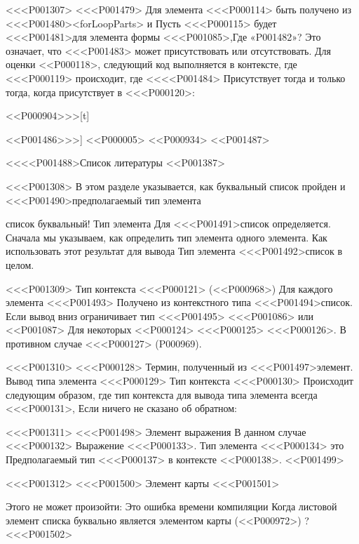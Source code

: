 {{{{{{{{{{{<<<P001307>%
<<<P001479> Для элемента
<<<P000114> быть получено из <<<P001480>{<forLoopParts>} и
Пусть <<<P000115> будет <<<P001481>{для элемента} формы
<<<P001085>,Где «P001482»? Это означает, что <<<P001483> может присутствовать или отсутствовать.
Для оценки <<P000118>,
следующий код выполняется в контексте, где <<<P000119> происходит,
где <<<<P001484> Присутствует тогда и только тогда, когда присутствует в <<<P000120>:

\vspace{-2ex}<<P000904>>>[t]{<<P001486>>>]
<<P000005>
<<P000934>
<<P001487>


<<<<P001488>{Список литературы}
<<P001387>

<<<P001308>%
В этом разделе указывается, как буквальный список  пройден и
<<<P001490>{предполагаемый тип элемента}{список буквальный! Тип элемента
Для <<<P001491>{список} определяется.
Сначала мы указываем, как определить тип элемента одного элемента.
Как использовать этот результат для вывода
Тип элемента <<<P001492>{список} в целом.

<<<P001309>%
Тип контекста <<<P000121>
(<<P000968>)
Для каждого элемента <<<P001493>
Получено из контекстного типа <<<P001494>{список}.
Если вывод вниз ограничивает тип <<<P001495>
<<<P001086> или <<P001087> Для некоторых <<P000124>
<<<P000125> <<<P000126>.
В противном случае <<<P000127> \FreeContext{}
(P000969).

<<<P001310>%
<<<P000128> Термин, полученный из <<<P001497>{элемент}.
Вывод типа элемента <<<P000129> Тип контекста <<<P000130>
Происходит следующим образом,
где тип контекста для вывода типа элемента всегда <<<P000131>,
Если ничего не сказано об обратном:

<<<P001311>%
<<<P001498> Элемент выражения
В данном случае <<<P000132> Выражение <<<P000133>.
Тип элемента <<<P000134> это
Предполагаемый тип <<<P000137> в контексте <<P000138>.
<<P001499>

<<<P001312>%
<<<P001500> Элемент карты
<<<P001501>{%
Этого не может произойти:
Это ошибка времени компиляции
Когда листовой элемент списка буквально является элементом карты
(<<P000972>)%
?
<<<P001502>

}}}}}}}}}}}}}}
